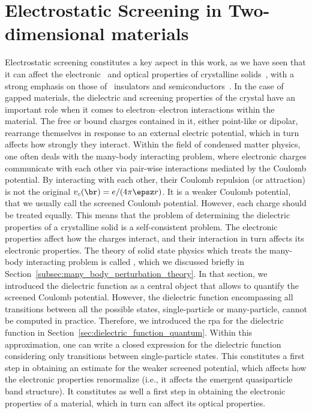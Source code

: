 
%

\chapter{Electrostatic Screening in Two-dimensional materials}
\label{ch:screening}
\glsresetall

Electrostatic screening constitutes a key aspect in this work, as we have seen that it can affect the electronic~\cite{PhysRevMaterials.5.084203,Domaretskiy_Wu_2025} and optical properties of crystalline solids~\cite{Emory_Nie_1998,Thorsten_Thygesen_2019}, with a strong emphasis on those of \bd~insulators and semiconductors~\cite{Cudazzo_2011,Das_Sarma_Hwang_2015,Ben_Wilson_2025,Tian_Elton_2020}.
In the case of gapped materials, the dielectric and screening properties of the crystal have an important role when it comes to electron--electron interactions within the material.
The free or bound charges contained in it, either point-like or dipolar, rearrange themselves in response to an external electric potential, which in turn affects how strongly they interact.
Within the field of condensed matter physics, one often deals with the many-body interacting problem, where electronic charges communicate with each other via pair-wise interactions mediated by the Coulomb potential.
By interacting with each other, their Coulomb repulsion (or attraction) is not the original $v_c(\br) = e/(4\pi\epsz r)$.
It is a weaker Coulomb potential, that we usually call the screened Coulomb potential.
However, each charge should be treated equally.
This means that the problem of determining the dielectric properties of a crystalline solid is a self-consistent problem.
The electronic properties affect how the charges interact, and their interaction in turn affects its electronic properties.
The theory of solid state physics which treats the many-body interacting problem is called \mbpt, which we discussed briefly in Section~\ref{subsec:many_body_perturbation_theory}.
In that section, we introduced the dielectric function as a central object that allows to quantify the screened Coulomb potential.
However, the dielectric function encompassing all transitions between all the possible states, single-particle or many-particle, cannot be computed in practice.
Therefore, we introduced the \gls{rpa} for the dielectric function in Section~\ref{sec:dielectric_function_quantum}.
Within this approximation, one can write a closed expression for the dielectric function considering only transitions between single-particle states.
This constitutes a first step in obtaining an estimate for the weaker screened potential, which affects how the electronic properties renormalize (i.e., it affects the emergent quasiparticle band structure).
It constitutes as well a first step in obtaining the electronic properties of a material, which in turn can affect its optical properties.

